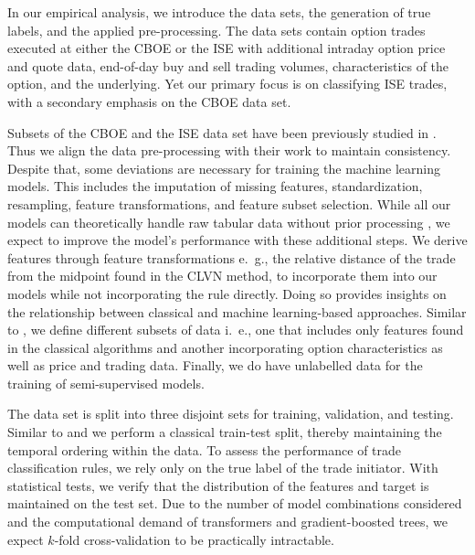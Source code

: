 In our empirical analysis, we introduce the data sets, the generation of true labels, and the applied pre-processing. The data sets contain option trades executed at either the \gls{CBOE} or the \gls{ISE} with additional intraday option price and quote data, end-of-day buy and sell trading volumes, characteristics of the option, and the underlying. Yet our primary focus is on classifying \gls{ISE} trades, with a secondary emphasis on the \gls{CBOE} data set. 

Subsets of the \gls{CBOE} and the \gls{ISE} data set have been previously studied in \textcite{grauerOptionTradeClassification2022}. Thus we align the data pre-processing with their work to maintain consistency. Despite that, some deviations are necessary for training the machine learning models. This includes the imputation of missing features, standardization, resampling, feature transformations, and feature subset selection. While all our models can theoretically handle raw tabular data without prior processing \autocites{arikTabNetAttentiveInterpretable2020}{prokhorenkovaCatBoostUnbiasedBoosting2018}{xuModelingTabularData2019}, we expect to improve the model's performance with these additional steps. We derive features through feature transformations e.~g., the relative distance of the trade from the midpoint found in the CLVN method, to incorporate them into our models while not incorporating the rule directly. Doing so provides insights on the relationship between classical and machine learning-based approaches. Similar to \textcite{ronenMachineLearningTrade2022}, we define different subsets of data i.~e., one that includes only features found in the classical algorithms and another incorporating option characteristics as well as price and trading data. Finally, we do have unlabelled data for the training of semi-supervised models.

The data set is split into three disjoint sets for training, validation, and testing. Similar to \textcite{ellisAccuracyTradeClassification2000} and \textcite{ronenMachineLearningTrade2022} we perform a classical train-test split, thereby maintaining the temporal ordering within the data. To assess the performance of trade classification rules, we rely only on the true label of the trade initiator. With statistical tests, we verify that the distribution of the features and target is maintained on the test set. Due to the number of model combinations considered and the computational demand of transformers and gradient-boosted trees, we expect $k$-fold cross-validation to be practically intractable.

